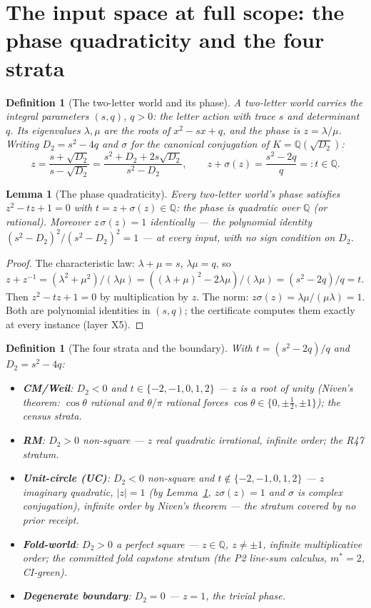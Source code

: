 \documentclass[11pt]{article}
\newcommand{\Q}{\mathbb Q}
\newtheorem{lemma}[theorem]{Lemma}
\newtheorem{definition}[theorem]{Definition}
\begin{document}
\section{The input space at full scope: the phase quadraticity and the
four strata}

\begin{definition}[The two-letter world and its phase]\label{def:world}
A two-letter world carries the integral parameters $(s,q)$, $q>0$:
the letter action with trace $s$ and determinant $q$. Its
eigenvalues $\lambda,\mu$ are the roots of $x^2-sx+q$, and the
\emph{phase} is $z=\lambda/\mu$. Writing
$D_2=s^2-4q$ and $\sigma$ for the canonical conjugation of
$K=\Q(\sqrt{D_2})$:
\[
z=\frac{s+\sqrt{D_2}}{s-\sqrt{D_2}}
=\frac{s^2+D_2+2s\sqrt{D_2}}{s^2-D_2},
\qquad
z+\sigma(z)=\frac{s^2-2q}{q}=:t\in\Q .
\]
\end{definition}

\begin{lemma}[The phase quadraticity]\label{lem:quad}
Every two-letter world's phase satisfies
$z^2-tz+1=0$ with $t=z+\sigma(z)\in\Q$: the phase is quadratic over
$\Q$ (or rational). Moreover $z\,\sigma(z)=1$ identically --- the
polynomial identity $(s^2-D_2)^2/(s^2-D_2)^2=1$ --- at every input,
with no sign condition on $D_2$.
\end{lemma}

\begin{proof}
The characteristic law: $\lambda+\mu=s$, $\lambda\mu=q$, so
$z+z^{-1}=(\lambda^2+\mu^2)/(\lambda\mu)=((\lambda+\mu)^2-2\lambda\mu)/
(\lambda\mu)=(s^2-2q)/q=t$. Then $z^2-tz+1=0$ by multiplication by
$z$. The norm: $z\sigma(z)=\lambda\mu/(\mu\lambda)=1$. Both are
polynomial identities in $(s,q)$; the certificate computes them
exactly at every instance (layer X5).
\end{proof}

\begin{definition}[The four strata and the boundary]\label{def:strata}
With $t=(s^2-2q)/q$ and $D_2=s^2-4q$:
\begin{itemize}
\item \textbf{CM/Weil}: $D_2<0$ and $t\in\{-2,-1,0,1,2\}$ --- $z$ is
a root of unity (Niven's theorem: $\cos\theta$ rational and
$\theta/\pi$ rational forces $\cos\theta\in\{0,\pm\tfrac12,\pm1\}$);
the census strata.
\item \textbf{RM}: $D_2>0$ non-square --- $z$ real quadratic
irrational, infinite order; the R47 stratum.
\item \textbf{Unit-circle (UC)}: $D_2<0$ non-square and
$t\notin\{-2,-1,0,1,2\}$ --- $z$ imaginary quadratic, $|z|=1$
(by Lemma~\ref{lem:quad}, $z\sigma(z)=1$ and $\sigma$ is complex
conjugation), \emph{infinite} order by Niven's theorem --- the
stratum covered by no prior receipt.
\item \textbf{Fold-world}: $D_2>0$ a perfect square --- $z\in\Q$,
$z\ne\pm1$, infinite multiplicative order; the committed fold
capstone stratum (the P2 line-sum calculus, $m^*=2$, CI-green).
\item \textbf{Degenerate boundary}: $D_2=0$ --- $z=1$, the trivial
phase.
\end{itemize}
\end{definition}
\end{document}
